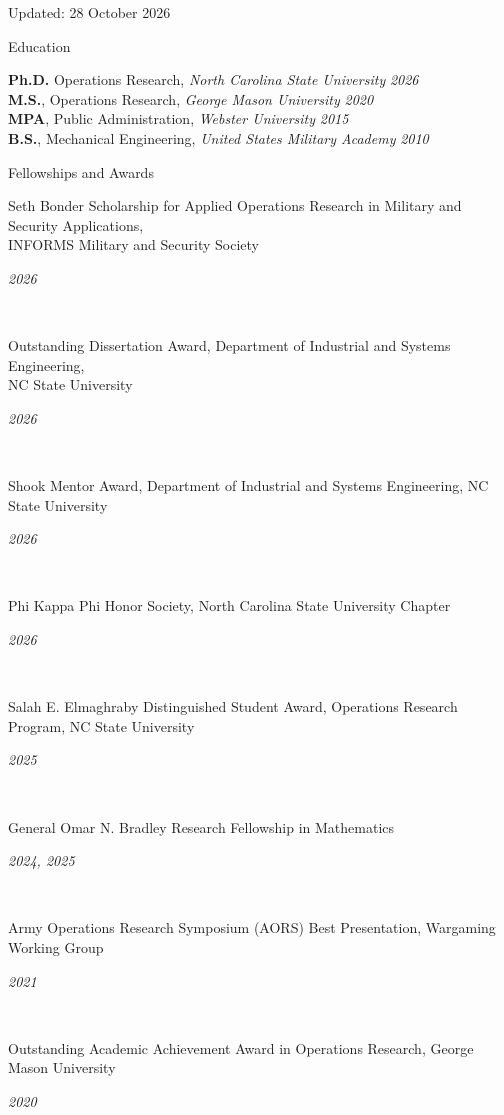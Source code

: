 \documentclass[
	11pt,
]{resume}
\newcommand{\cvhonor}[2]{%
    \noindent
    \begin{minipage}[t]{\dimexpr\linewidth-5.75em\relax}
        #1\strut
    \end{minipage}\hfill
    \begin{minipage}[t]{5.5em}
        \raggedleft\textit{#2}\strut
    \end{minipage}%
}
\begin{document}
\begin{center}
    Updated: 28 October 2026
\end{center}

\begin{rSection}{Education}
	
\textbf{Ph.D.} Operations Research, \textit{North Carolina State University} \hfill \textit{2026} \\
\textbf{M.S.}, Operations Research, \textit{George Mason University} \hfill \textit{2020} \\
\textbf{MPA}, Public Administration, \textit{Webster University} \hfill \textit{2015} \\
\textbf{B.S.}, Mechanical Engineering, \textit{United States Military Academy} \hfill \textit{2010}
	
\end{rSection}

\begin{rSection}{Fellowships and Awards}
    \cvhonor{Seth Bonder Scholarship for Applied Operations Research in Military and Security Applications,\\ INFORMS Military and Security Society}{2026} \\
    \cvhonor{Outstanding Dissertation Award, Department of Industrial and Systems Engineering,\\ NC State University}{2026} \\
    \cvhonor{Shook Mentor Award, Department of Industrial and Systems Engineering, NC State University}{2026} \\
    \cvhonor{Phi Kappa Phi Honor Society, North Carolina State University Chapter}{2026} \\
    \cvhonor{Salah E. Elmaghraby Distinguished Student Award, Operations Research Program, NC State University}{2025} \\
    \cvhonor{General Omar N. Bradley Research Fellowship in Mathematics}{2024, 2025} \\
    \cvhonor{Army Operations Research Symposium (AORS) Best Presentation, Wargaming Working Group}{2021} \\
    \cvhonor{Outstanding Academic Achievement Award in Operations Research, George Mason University}{2020}
\end{rSection}
\end{document}

